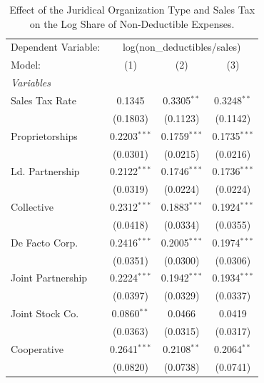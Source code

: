 \documentclass[
  12pt]{article}
\theoremstyle{definition}
\theoremstyle{remark}
\begin{document}
\begin{table}

\caption{\label{tbl-reg-non-ded}Effect of the Juridical Organization
Type and Sales Tax on the Log Share of Non-Deductible Expenses.}

\begin{minipage}{\linewidth}

\begingroup
\centering
\begin{tabular}{lccc}
   \tabularnewline \midrule \midrule
   Dependent Variable: & \multicolumn{3}{c}{log(non\_deductibles/sales)}\\
   Model:            & (1)            & (2)            & (3)\\  
   \midrule
   \emph{Variables}\\
   Sales Tax Rate    & 0.1345         & 0.3305$^{**}$  & 0.3248$^{**}$\\   
                     & (0.1803)       & (0.1123)       & (0.1142)\\   
   Proprietorships   & 0.2203$^{***}$ & 0.1759$^{***}$ & 0.1735$^{***}$\\   
                     & (0.0301)       & (0.0215)       & (0.0216)\\   
   Ld. Partnership   & 0.2122$^{***}$ & 0.1746$^{***}$ & 0.1736$^{***}$\\   
                     & (0.0319)       & (0.0224)       & (0.0224)\\   
   Collective        & 0.2312$^{***}$ & 0.1883$^{***}$ & 0.1924$^{***}$\\   
                     & (0.0418)       & (0.0334)       & (0.0355)\\   
   De Facto Corp.    & 0.2416$^{***}$ & 0.2005$^{***}$ & 0.1974$^{***}$\\   
                     & (0.0351)       & (0.0300)       & (0.0306)\\   
   Joint Partnership & 0.2224$^{***}$ & 0.1942$^{***}$ & 0.1934$^{***}$\\   
                     & (0.0397)       & (0.0329)       & (0.0337)\\   
   Joint Stock Co.   & 0.0860$^{**}$  & 0.0466         & 0.0419\\   
                     & (0.0363)       & (0.0315)       & (0.0317)\\   
   Cooperative       & 0.2641$^{***}$ & 0.2108$^{**}$  & 0.2064$^{**}$\\   
                     & (0.0820)       & (0.0738)       & (0.0741)\\   

\end{tabular}
\end{minipage}
\end{table}
\end{document}
